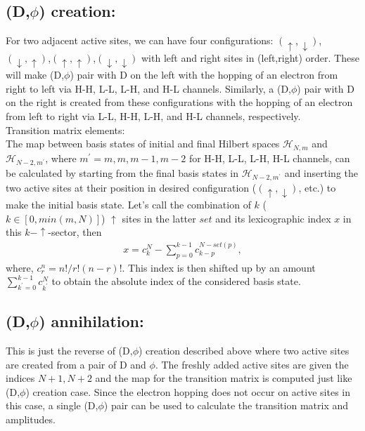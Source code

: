 \documentclass[a4paper,twocolumn]{revtex4-1} %
\newcommand{\da}{\downarrow}
\newcommand{\ua}{\uparrow}
\begin{document}
\subsection{(D,$\phi$) creation: }
For two adjacent active sites,
we can have four configurations:
$(\ua,\da)$, $(\da,\ua)$,$(\ua,\ua)$,$(\da,\da)$ with left and right sites in (left,right) order.
These will make (D,$\phi$) pair with D on the left 
with the hopping of an electron from right to left 
via H-H, L-L, L-H, and H-L channels.
Similarly,
a (D,$\phi$) pair with D on the right is created from these configurations
with the hopping of an electron from left to right
via L-L, H-H, L-H, and H-L channels, respectively.
\\Transition matrix elements:\\
The map between basis states of initial and final Hilbert spaces
$\mathcal{H}_{N,m}$ and $\mathcal{H}_{N-2,m^\prime}$, 
where $m^\prime=m,m,m-1,m-2$ for H-H, L-L, L-H, H-L channels,
can be calculated by starting from the final basis states in $\mathcal{H}_{N-2,m^\prime}$ 
and inserting the two active sites
at their position in desired configuration ($(\ua,\da)$, etc.) to make the initial basis state.
Let's call the combination of $k$ ($k\in [0,min(m,N)]$) $\ua$ sites in the latter $set$ and its lexicographic index
$x$ in this $k-\ua$-sector, then
\begin{eqnarray*}
x = c^N_ k - 
   \sum_{p=0}^{k-1}c^{N - set(p)}_{ k - p},
\end{eqnarray*}  
 where, $c^n_r = {n!}/{r!(n-r)!}$.
  This index is then shifted up by an amount 
$\sum_{k^\prime=0}^{k-1} c^N_{k^\prime}$ to obtain the absolute index of the considered basis state.









\subsection{(D,$\phi$) annihilation: }
This is just the reverse of (D,$\phi$) creation described above where two active sites are created
from a pair of D and $\phi$. The freshly added active sites are given the indices $N+1,N+2$
and the map for the transition matrix is computed just like (D,$\phi$) creation case.
Since the electron hopping does not occur on active sites in this case,
a single (D,$\phi$) pair can be used to calculate the transition matrix and amplitudes.
\end{document}
